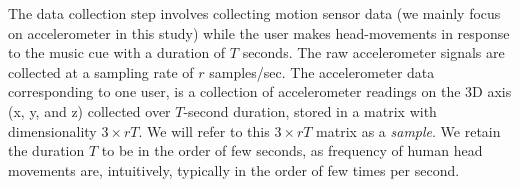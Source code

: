 The data collection step involves collecting motion sensor data (we mainly focus on accelerometer in this study) while the user makes head-movements
in response to the music cue  with a duration of $T$ seconds.
The raw accelerometer
signals are collected at
a sampling rate of $r$ samples/sec. %
The accelerometer data corresponding to one user,  is a
collection of accelerometer readings on the
3D axis (x, y, and z) collected over $T$-second duration,
stored in a matrix with dimensionality $3\times rT$. %
We will refer to this $3\times rT$ matrix as a {\em sample}.
We retain the duration $T$ to be in the order of few seconds, as frequency of
human head movements are, intuitively, typically in the order of few times per
second. %






